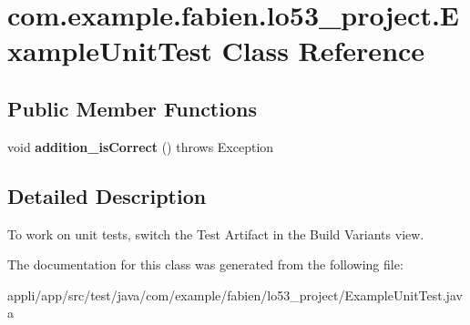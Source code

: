 \hypertarget{classcom_1_1example_1_1fabien_1_1lo53__project_1_1ExampleUnitTest}{\section{com.\-example.\-fabien.\-lo53\-\_\-project.\-Example\-Unit\-Test Class Reference}
\label{classcom_1_1example_1_1fabien_1_1lo53__project_1_1ExampleUnitTest}
}
\subsection*{Public Member Functions}
\begin{DoxyCompactItemize}
\item 
\hypertarget{classcom_1_1example_1_1fabien_1_1lo53__project_1_1ExampleUnitTest_aa992fe18142b77ce997ac20ecbc0d2ed}{void {\bfseries addition\-\_\-is\-Correct} ()  throws Exception }\label{classcom_1_1example_1_1fabien_1_1lo53__project_1_1ExampleUnitTest_aa992fe18142b77ce997ac20ecbc0d2ed}

\end{DoxyCompactItemize}


\subsection{Detailed Description}
To work on unit tests, switch the Test Artifact in the Build Variants view. 

The documentation for this class was generated from the following file\-:\begin{DoxyCompactItemize}
\item 
appli/app/src/test/java/com/example/fabien/lo53\-\_\-project/Example\-Unit\-Test.\-java\end{DoxyCompactItemize}
